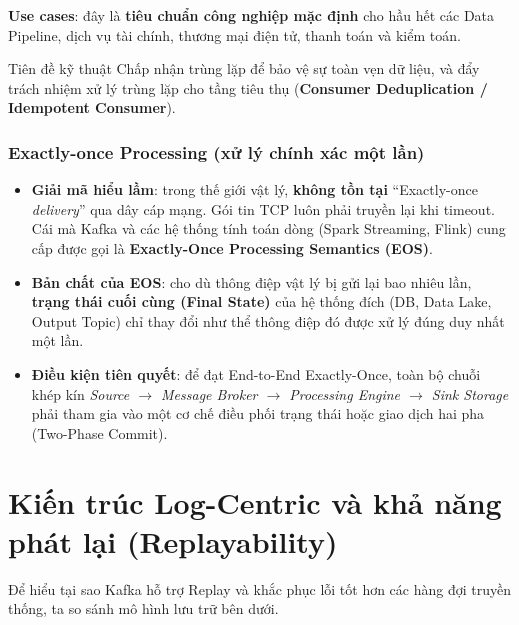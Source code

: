 \documentclass[12pt]{article}
\begin{document}
\textbf{Use cases}: đây là \textbf{tiêu chuẩn công nghiệp mặc định} cho hầu hết các Data Pipeline, dịch vụ tài chính, thương mại điện tử, thanh toán và kiểm toán.

\begin{infobox}{Tiên đề kỹ thuật}
Chấp nhận trùng lặp để bảo vệ sự toàn vẹn dữ liệu, và đẩy trách nhiệm xử lý trùng lặp cho tầng tiêu thụ (\textbf{Consumer Deduplication / Idempotent Consumer}).
\end{infobox}

\subsubsection{Exactly-once Processing (xử lý chính xác một lần)}

\begin{itemize}
    \item \textbf{Giải mã hiểu lầm}: trong thế giới vật lý, \textbf{không tồn tại} ``Exactly-once \textit{delivery}'' qua dây cáp mạng. Gói tin TCP luôn phải truyền lại khi timeout. Cái mà Kafka và các hệ thống tính toán dòng (Spark Streaming, Flink) cung cấp được gọi là \textbf{Exactly-Once Processing Semantics (EOS)}.
    \item \textbf{Bản chất của EOS}: cho dù thông điệp vật lý bị gửi lại bao nhiêu lần, \textbf{trạng thái cuối cùng (Final State)} của hệ thống đích (DB, Data Lake, Output Topic) chỉ thay đổi như thể thông điệp đó được xử lý đúng duy nhất một lần.
    \item \textbf{Điều kiện tiên quyết}: để đạt End-to-End Exactly-Once, toàn bộ chuỗi khép kín \textit{Source $\rightarrow$ Message Broker $\rightarrow$ Processing Engine $\rightarrow$ Sink Storage} phải tham gia vào một cơ chế điều phối trạng thái hoặc giao dịch hai pha (Two-Phase Commit).
\end{itemize}

\section{Kiến trúc Log-Centric và khả năng phát lại (Replayability)}

Để hiểu tại sao Kafka hỗ trợ Replay và khắc phục lỗi tốt hơn các hàng đợi truyền thống, ta so sánh mô hình lưu trữ bên dưới.
\end{document}
